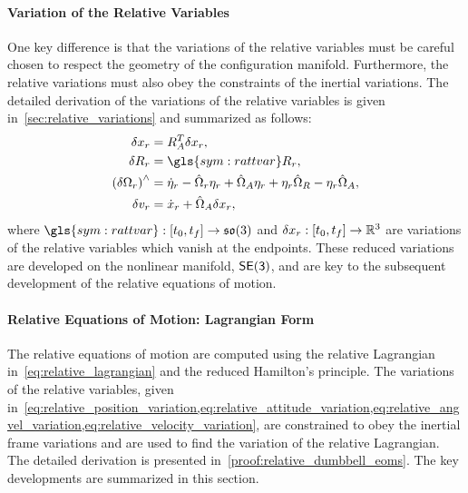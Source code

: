 \paragraph{Variation of the Relative Variables}\label{ssec:var_rel_lagrangian}

One key difference is that the variations of the relative variables must be careful chosen to respect the geometry of the configuration manifold.
Furthermore, the relative variations must also obey the constraints of the inertial variations.
The detailed derivation of the variations of the relative variables is given in~\cref{sec:relative_variations} and summarized as follows:
\begin{align}
    \delta \rpos &= \aatt^T \delta \rpos,\label{eq:relative_position_variation} \\
    \delta \ratt &= \gls{sym:rattvar} \ratt,\label{eq:relative_attitude_variation}\\
    \parenth{\delta \rangvel}^\wedge&= \dot{\eta}_r - \hat{\Omega}_r \rattvar + \hat{\Omega}_A \rattvar + \rattvar \hat{\Omega}_R - \rattvar \hat{\Omega}_A, \label{eq:relative_angvel_variation}\\
    \delta \rvel &= \dot{x}_r + \hat{\Omega}_A \delta \rpos,\label{eq:relative_velocity_variation}
\end{align}
where \( \gls{sym:rattvar} : \bracket{t_0, t_f} \to \so \) and \( \delta x_r : \left[ t_0, t_f \right] \to \mathbb{R}^3 \) are variations of the relative variables which vanish at the endpoints.
These reduced variations are developed on the nonlinear manifold, \( \mathsf{SE(3)} \), and are key to the subsequent development of the relative equations of motion.

\paragraph{Relative Equations of Motion: Lagrangian Form}
The relative equations of motion are computed using the relative Lagrangian in~\cref{eq:relative_lagrangian} and the reduced Hamilton's principle.
The variations of the relative variables, given in~\cref{eq:relative_position_variation,eq:relative_attitude_variation,eq:relative_angvel_variation,eq:relative_velocity_variation}, are constrained to obey the inertial frame variations and are used to find the variation of the relative Lagrangian.
The detailed derivation is presented in~\cref{proof:relative_dumbbell_eoms}.
The key developments are summarized in this section.

